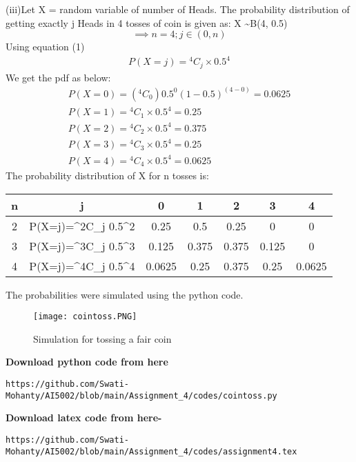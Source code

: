 \documentclass[journal,12pt,twocolumn]{IEEEtran}
\newcommand*{\Comb}[2]{{}^{#1}C_{#2}}%
\begin{document}
(iii)Let X = random variable of number of Heads.
The probability distribution of getting exactly j Heads in 4 tosses of coin is given as:  X \sim B(4, 0.5) 
\[\implies n=4; j \in (0,n)\]
Using equation (1)
\begin{align}
    P(X = j)  =\Comb{4}{j}\times { 0.5^4}
\end{align}
We get the pdf as below:
\begin{align}
    P(X=0) =(\Comb{4}{0}){ 0.5^0 (1-0.5)^{(4-0)}}
    =0.0625
    \\P(X=1) = \Comb{4}{1}\times { 0.5^4} = 0.25
    \\P(X=2) = \Comb{4}{2}\times { 0.5^4} = 0.375
    \\P(X=3) = \Comb{4}{3}\times { 0.5^4} = 0.25
    \\P(X=4) = \Comb{4}{4}\times { 0.5^4} = 0.0625
\end{align}
The probability distribution of X for n tosses is: 

\begin{center}
\begin{tabular}{ |c|c|c|c|c|c|c| } 
 \hline
n & j & 0 & 1 & 2 & 3&4 \\ \hline
  2 & P(X=j)=\Comb{2}{j} { 0.5^2}  & 0.25 &0.5 & 0.25 & 0 & 0\\ 
 \hline
 3 &P(X=j)=\Comb{3}{j} { 0.5^3} & 0.125& 0.375 & 0.375 & 0.125 & 0 \\ 
 \hline
4 & P(X=j)=\Comb{4}{j} { 0.5^4} & 0.0625 & 0.25 & 0.375 & 0.25 & 0.0625 \\ 
 \hline
\end{tabular}
\end{center}
The probabilities were simulated using the python code.
\begin{figure}[h]
\renewcommand{\theenumi}{1}
\centering
\texttt{[image: cointoss.PNG]}
\caption{Simulation for tossing a fair coin  }
\label{Fig:1}
\end{figure}

\textbf{Download python code from here}\\
\begin{lstlisting}
https://github.com/Swati-Mohanty/AI5002/blob/main/Assignment_4/codes/cointoss.py
\end{lstlisting}
\textbf{Download latex code from here-}\\
\begin{lstlisting}
https://github.com/Swati-Mohanty/AI5002/blob/main/Assignment_4/codes/assignment4.tex
\end{lstlisting}
\end{document}
